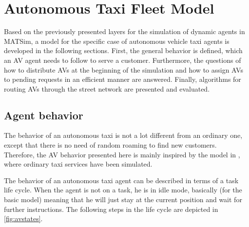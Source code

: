 \section{Autonomous Taxi Fleet Model}
\label{sec:avmodel}

Based on the previously presented layers for the simulation of dynamic agents in
MATSim, a model for the specific case of autonomous vehicle taxi agents is developed
in the following sections. First, the general behavior is defined, which an AV agent needs to follow to serve a customer.
Furthermore, the questions of how to distribute AVs at the beginning of the simulation
and how to assign AVs to pending requests in an efficient manner are answered.
Finally, algorithms for routing AVs through the street network are presented and
evaluated.

\subsection{Agent behavior}

The behavior of an autonomous taxi is not a lot different from an ordinary one,
except that there is no need of random roaming to find new customers. Therefore,
the AV behavior presented here is mainly inspired by the model in \citet{Maciejewski2015}, where
ordinary taxi services have been simulated.

The behavior of an autonomous taxi agent can be described in terms of a task life
cycle. When the agent is not on a task, he is in idle mode, basically (for the basic
model) meaning that he will just stay at the current position and wait for further
instructions. The following steps in the life cycle are depicted in \cref{fig:avstates}.


